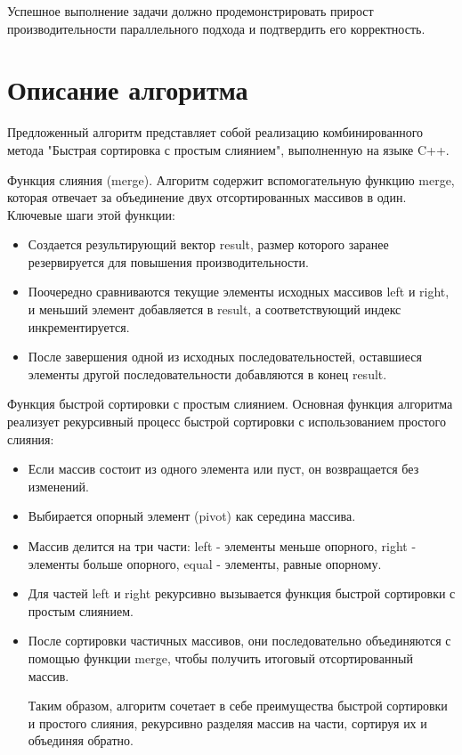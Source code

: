 \documentclass[a4paper,12pt]{article}
\begin{document}
Успешное выполнение задачи должно продемонстрировать прирост производительности параллельного подхода и подтвердить его корректность.

\newpage

\section*{\centering Описание алгоритма}

Предложенный алгоритм представляет собой реализацию комбинированного метода "Быстрая сортировка с простым слиянием", выполненную на языке C++.

Функция слияния (merge). Алгоритм содержит вспомогательную функцию merge, которая отвечает за объединение двух отсортированных массивов в один.
Ключевые шаги этой функции:
\begin{itemize}
    \item Создается результирующий вектор result, размер которого заранее резервируется для повышения производительности.
    \item Поочередно сравниваются текущие элементы исходных массивов left и right, и меньший элемент добавляется в result, а соответствующий индекс инкрементируется.
    \item После завершения одной из исходных последовательностей, оставшиеся элементы другой последовательности добавляются в конец result.
\end{itemize}

Функция быстрой сортировки с простым слиянием. Основная функция алгоритма реализует рекурсивный процесс быстрой сортировки с использованием простого слияния:
\begin{itemize}
    \item Если массив состоит из одного элемента или пуст, он возвращается без изменений.
    \item Выбирается опорный элемент (pivot) как середина массива.
    \item Массив делится на три части: left - элементы меньше опорного, right - элементы больше опорного, equal - элементы, равные опорному.
    \item Для частей left и right рекурсивно вызывается функция быстрой сортировки с простым слиянием.
    \item После сортировки частичных массивов, они последовательно объединяются с помощью функции merge, чтобы получить итоговый отсортированный массив.

Таким образом, алгоритм сочетает в себе преимущества быстрой сортировки и простого слияния, рекурсивно разделяя массив на части, сортируя их и объединяя обратно.
\end{itemize}
\end{document}
